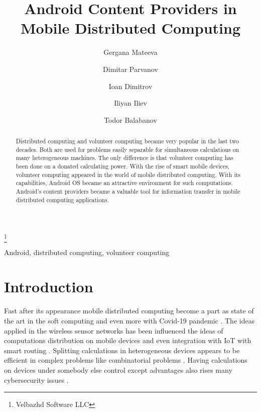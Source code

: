 \documentclass{ifacconf}
\begin{document}
\begin{frontmatter}

\title{Android Content Providers in Mobile Distributed Computing } 

\thanks[footnoteinfo]{Velbazhd Software LLC}

\author[First]{Gergana Mateeva} 
\author[First]{Dimitar Parvanov} 
\author[Second]{Ioan Dimitrov} 
\author[First]{Iliyan Iliev}
\author[First]{Todor Balabanov} 

\address[First]{Bulgarian Academy of Sciences\\Institute of Information and Communication Technologies\\acad. Georgi Bonchev Str., block 2, 1113 Sofia, Bulgaria\\(gergana.mateeva, dimitar.parvanov, iliyan.iliev, todor.balabanov) @iict.bas.bg}
\address[Second]{Technical University of Sofia\\Faculty of Electronic Engineering and Technology\\8 St. Kliment Ohridski Blvd., block 1, 1756 Sofia, Bulgaria\\joancdimitrov@tu-sofia.bg}

\begin{abstract}
Distributed computing and volunteer computing became very popular in the last two decades. Both are used for problems easily separable for simultaneous calculations on many heterogeneous machines. The only difference is that volunteer computing has been done on a donated calculating power. With the rise of smart mobile devices, volunteer computing appeared in the world of mobile distributed computing. With its capabilities, Android OS became an attractive environment for such computations. Android's content providers became a valuable tool for information transfer in mobile distributed computing applications. 
\end{abstract}

\begin{keyword}
Android, distributed computing, volunteer computing
\end{keyword}

\end{frontmatter}

\section{Introduction}

Fast after its appearance mobile distributed computing become a part as state of the art in the soft computing \cite{Angelova-2009-a} and even more with Covid-19 pandemic \cite{Petrov-2021-a}. The ideas applied in the wireless sensor networks \cite{Alexandrov-2016-a} has been influenced the ideas of computations distribution on mobile devices and even integration with IoT \cite{Dineva-2019-a} with smart routing \cite{Tashev-2019-a}. Splitting calculations in heterogeneous devices appears to be efficient in complex problems like combinatorial problems \cite{Borissova-2015-a}. Having calculations on devices under somebody else control except advantages also rises many cybersecurity issues \cite{Dimitrov-2021-a}.
\end{document}
